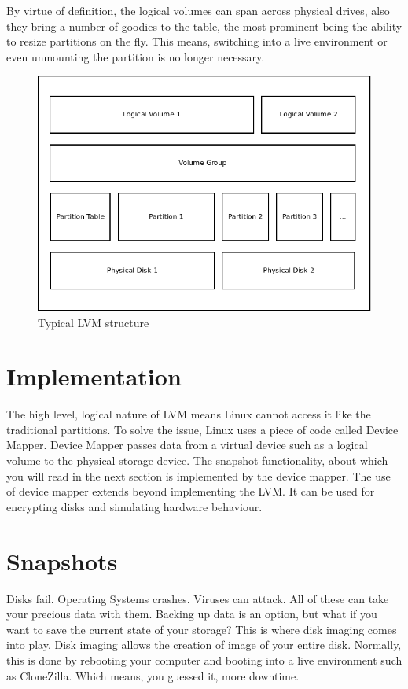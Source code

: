 By virtue of definition, the logical volumes can span across physical drives,
also they bring a number of goodies to the table, the most prominent being the
ability to resize partitions on the fly. This means, switching into a live
environment or even unmounting the partition is no longer necessary.

\begin{figure}
	\centering
	\includegraphics[scale=0.5]{lvm.png}
	\caption{Typical LVM structure}
\end{figure}


\section{Implementation}
The high level, logical nature of LVM means Linux cannot access it like the
traditional partitions. To solve the issue, Linux uses a piece of code called
Device Mapper. Device Mapper passes data from a virtual device such as a logical
volume to the physical storage device. The snapshot functionality, about which
you will read in the next section is implemented by the device mapper. The use
of device mapper extends beyond implementing the LVM. It can be used for
encrypting disks and simulating hardware behaviour.

\section{Snapshots}
Disks fail. Operating Systems crashes. Viruses can attack. All of these can take
your precious data with them. Backing up data is an option, but what if you want
to save the current state of your storage? This is where disk imaging comes into
play. Disk imaging allows the creation of image of your entire disk. Normally,
this is done by rebooting your computer and booting into a live environment such
as CloneZilla. Which means, you guessed it, more downtime.\\

